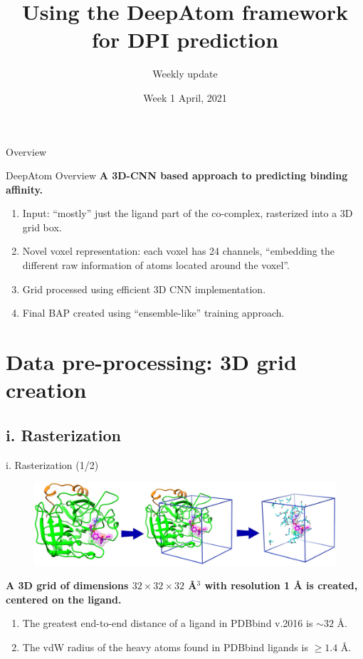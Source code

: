 \documentclass[aspectratio=169,xcolor=dvipsnames]{beamer}
\title[DeepAtom]{Using the DeepAtom framework for DPI prediction}
\subtitle{Weekly update}
\date{Week 1 April, 2021}
\begin{document}
\begin{frame}
    \titlepage
\end{frame}

\begin{frame}{Overview}
    \tableofcontents
\end{frame}

\begin{frame}{DeepAtom Overview}
    \textbf{A 3D-CNN based approach to predicting binding affinity.}
    \vspace{5mm}
    \begin{enumerate}
        \item Input: ``mostly'' just the ligand part of the co-complex,
        rasterized into a 3D grid box.
        \item Novel voxel representation: each voxel has 24 channels, ``embedding the different raw information of atoms located around the voxel''.
        \item Grid processed using efficient 3D CNN implementation.
        \item Final BAP created using ``ensemble-like'' training approach. 
    \end{enumerate}
\end{frame}

\section{Data pre-processing: 3D grid creation}
\subsection{i. Rasterization}
\begin{frame}{i. Rasterization (1/2)}
    \begin{figure}
        \includegraphics[width=0.8\linewidth]{images/grid_top}
    \end{figure}
    \textbf{A 3D grid of dimensions $32\times32\times32$ \r{A}$^3$ with resolution 1
    \r{A} is created, centered on the ligand.}
    \vspace{2mm}
    \begin{enumerate}
        \item The greatest end-to-end distance of a ligand in PDBbind v.2016 is $\sim32$ \r{A}.
        \item The vdW radius of the heavy atoms found in PDBbind ligands is
        $\geq 1.4$ \r{A}.
    \end{enumerate}
\end{frame}
\end{document}
